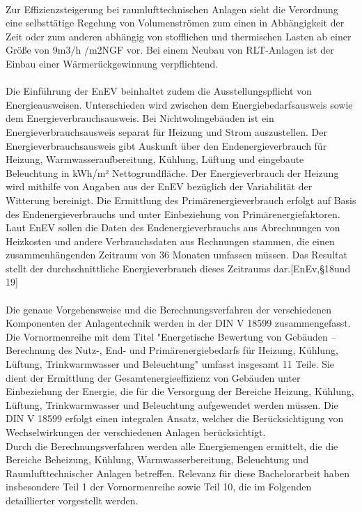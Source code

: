 \\
Zur Effizienzsteigerung bei raumlufttechnischen Anlagen sieht die Verordnung eine selbsttätige Regelung von Volumenströmen zum einen in Abhängigkeit der Zeit oder zum anderen abhängig von stofflichen und thermischen Lasten ab einer Größe von 9m3/h /m2NGF vor. Bei einem Neubau von RLT-Anlagen ist der Einbau einer Wärmerückgewinnung verpflichtend. \\
\\ 
Die Einführung der EnEV beinhaltet zudem die Ausstellungspflicht von Energieausweisen. Unterschieden wird zwischen dem  Energiebedarfsausweis sowie dem Energieverbrauchsausweis. Bei Nichtwohngebäuden ist ein Energieverbrauchsausweis separat für Heizung und Strom auszustellen. Der Energieverbrauchsausweis gibt Auskunft über den Endenergieverbrauch für Heizung, Warmwasseraufbereitung, Kühlung, Lüftung und eingebaute Beleuchtung in kWh/m² Nettogrundfläche. Der Energieverbrauch der Heizung wird mithilfe von Angaben aus der EnEV bezüglich der Variabilität der Witterung bereinigt. Die Ermittlung des Primärenergieverbrauch erfolgt auf Basis des Endenergieverbrauchs und unter Einbeziehung von Primärenergiefaktoren. Laut EnEV sollen die Daten des Endenergieverbrauchs  aus Abrechnungen von Heizkosten und andere Verbrauchsdaten aus Rechnungen stammen, die  einen zusammenhängenden Zeitraum von 36 Monaten umfassen müssen. Das Resultat stellt der durchschnittliche Energieverbrauch dieses Zeitraums dar.[EnEv,§18und 19] \\
\\
Die genaue Vorgehensweise und die Berechnungsverfahren der verschiedenen Komponenten der Anlagentechnik werden in der DIN V 18599 zusammengefasst. Die Vornormenreihe mit dem Titel "Energetische Bewertung von Gebäuden – Berechnung des Nutz-, End- und Primärenergiebedarfs für Heizung, Kühlung, Lüftung, Trinkwarmwasser und Beleuchtung" umfasst insgesamt 11 Teile. Sie dient der Ermittlung der Gesamtenergieeffizienz von Gebäuden unter Einbeziehung der Energie, die für die Versorgung der Bereiche Heizung, Kühlung, Lüftung, Trinkwarmwasser und Beleuchtung aufgewendet werden müssen. Die DIN V 18599 erfolgt einen integralen Ansatz, welcher die Berücksichtigung von Wechselwirkungen der verschiedenen Anlagen berücksichtigt. \\
Durch die Berechnungsverfahren werden alle Energiemengen ermittelt, die die Bereiche Beheizung, Kühlung, Warmwasserbereitung, Beleuchtung und Raumlufttechnischer Anlagen betreffen. Relevanz für diese Bachelorarbeit haben insbesondere Teil 1 der Vornormenreihe sowie Teil 10, die im Folgenden detaillierter vorgestellt werden. \\

